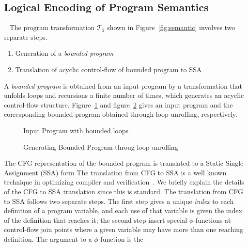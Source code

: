 {\subsection{Logical Encoding of Program Semantics}~\label{ssa-cite}
%
%
The program transformation $\mathcal{T}_2$ shown in Figure~\ref{fig:semantic}
involves two separate steps. 
\begin{enumerate}
  \item Generation of a \emph{bounded program}
  \item Translation of acyclic control-flow of bounded program to SSA
\end{enumerate}
%
%
A \emph{bounded program} is obtained from an input program by a transformation 
that unfolds loops and recursions a finite number of times, which generates an
acyclic control-flow structure.  Figure~\ref{fig:unwind} and figure~\ref{fig:unwind-cfg} 
gives an input program and the corresponding bounded program obtained through
loop unrolling, respectively.
%
\begin{figure}[htbp]
\centering
\vspace*{-0.2cm}
\caption{Input Program with bounded loops
  \label{fig:unwind}}
\end{figure}
%
\begin{figure}[htbp]
\centering
\vspace*{-0.2cm}
\caption{Generating Bounded Program throug loop unrolling
  \label{fig:unwind-cfg}}
\end{figure}
%
The CFG representation of the bounded program is 
translated to a Static Single Assignment (SSA) form 
The translation from CFG to SSA is a well known technique 
in optimizing compiler and verification~\cite{ssa1,ssa2,ssa1988,ssa1991}.  We 
briefly explain the details of the CFG to SSA translation since this is standard. 
%
%
The translation from CFG to SSA follows two separate steps.  
The first step gives a unique \emph{index} to each
definition of a program variable, and each use of that variable is given the
index of the definition that reaches it; the second step insert special 
$\phi$-functions at control-flow join points where a given variable may have
more than one reaching definition.  The argument to a $\phi$-function is the 
}
